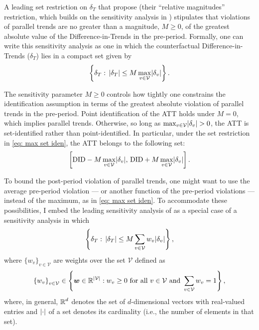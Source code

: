 \documentclass[twoside,11pt]{article}
\begin{document}
A leading set restriction on $\delta_T$ that \citet{rambachanroth2023} propose (their ``relative magnitudes'' restriction, which builds on the sensitivity analysis in \citet{manskipepper2018}) stipulates that violations of parallel trends are no greater than a magnitude, $M \geq 0$, of the greatest absolute value of the Difference-in-Trends in the pre-period. Formally, one can write this sensitivity analysis as one in which the counterfactual Difference-in-Trends ($\delta_T$) lies in a compact set given by
\begin{align} \label{eq: max set iden}
\left\{\delta_T: \, \lvert\delta_T\rvert \leq M \max \limits_{v \in \mathcal{V}} \lvert\delta_v\rvert \right\}.
\end{align}

The sensitivity parameter $M \geq 0$ controls how tightly one constrains the identification assumption in terms of the greatest absolute violation of parallel trends in the pre-period. Point identification of the \textrm{ATT} holds under $M = 0$, which implies parallel trends. Otherwise, so long as $\max_{v \in \mathcal{V}} \lvert\delta_v\rvert > 0$, the \textrm{ATT} is set-identified rather than point-identified. In particular, under the set restriction in \eqref{eq: max set iden}, the \textrm{ATT} belongs to the following set:
\begin{align}
\left[\textrm{DID} - M \max \limits_{v \in \mathcal{V}} \lvert\delta_v\rvert, \, \textrm{DID} + M \max \limits_{v \in \mathcal{V}} \lvert\delta_v\rvert \right].
\end{align}

To bound the post-period violation of parallel trends, one might want to use the average pre-period violation --- or another function of the pre-period violations --- instead of the maximum, as in \eqref{eq: max set iden}. To accommodate these possibilities, I embed the leading sensitivity analysis of \citet{rambachanroth2023} as a special case of a sensitivity analysis in which
\begin{align} \label{eq: weighted set iden}
\left\{\delta_T: \, \lvert\delta_T\rvert \leq M \sum \limits_{v \in \mathcal{V}} w_v \lvert\delta_v\rvert \right\},
\end{align}
where $\{w_{v}\}_{v \in \mathcal{V}}$ are weights over the set $\mathcal{V}$ defined as
\begin{equation} \label{eq: weights I}
\begin{split}
\left\{w_{v}\right\}_{v \in \mathcal{V}} \in \left\{\bm{w} \in \operatorname{\mathbb{R}}^{\lvert\mathcal{V}\rvert} : w_{v} \geq 0 \text{ for all } v \in \mathcal{V} \text{ and } \sum \limits_{v \in \mathcal{V}} w_{v} = 1\right\},
\end{split}
\end{equation}
where, in general, $\operatorname{\mathbb{R}}^d$ denotes the set of $d$-dimensional vectors with real-valued entries and $\lvert\cdot\rvert$ of a set denotes its cardinality (i.e., the number of elements in that set).
\end{document}
